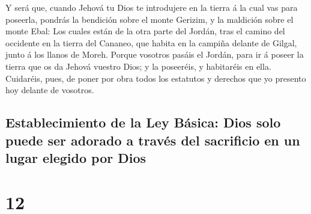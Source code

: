  Y será que, cuando Jehová tu Dios te introdujere en la
tierra á la cual vas para poseerla, pondrás la bendición sobre el monte
Gerizim, y la maldición sobre el monte Ebal:  Los cuales
están de la otra parte del Jordán, tras el camino del occidente en la
tierra del Cananeo, que habita en la campiña delante de Gilgal, junto á
los llanos de Moreh.  Porque vosotros pasáis el Jordán,
para ir á poseer la tierra que os da Jehová vuestro Dios; y la
poseeréis, y habitaréis en ella.  Cuidaréis, pues, de
poner por obra todos los estatutos y derechos que yo presento hoy
delante de vosotros.

\hypertarget{establecimiento-de-la-ley-buxe1sica-dios-solo-puede-ser-adorado-a-travuxe9s-del-sacrificio-en-un-lugar-elegido-por-dios}{%
\subsection{Establecimiento de la Ley Básica: Dios solo puede ser
adorado a través del sacrificio en un lugar elegido por
Dios}\label{establecimiento-de-la-ley-buxe1sica-dios-solo-puede-ser-adorado-a-travuxe9s-del-sacrificio-en-un-lugar-elegido-por-dios}}

\hypertarget{section-11}{%
\section{12}\label{section-11}}

